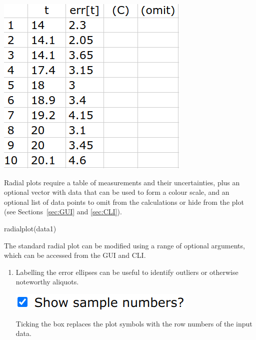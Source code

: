 \begin{refsection}
\noindent\begin{minipage}[t]{.27\linewidth}
  \strut\vspace*{-\baselineskip}\newline
  \includegraphics[width=\linewidth]{../figures/OtherRadialInput.png}
\end{minipage}
\begin{minipage}[t]{.73\linewidth}
  Radial plots require a table of measurements and their
  uncertainties, plus an optional vector with data that can be used to
  form a colour scale, and an optional list of data points to omit
  from the calculations or hide from the plot (see
  Sections~\ref{sec:GUI} and \ref{sec:CLI}).
\end{minipage}

\begin{console}
radialplot(data1)
\end{console}

The standard radial plot can be modified using a range of optional
arguments, which can be accessed from the GUI and CLI.

\begin{enumerate}

\item Labelling the error ellipses can be useful to identify outliers
  or otherwise noteworthy aliquots.

  \noindent\begin{minipage}[t]{.28\linewidth}
  \strut\vspace*{-\baselineskip}\newline
  \includegraphics[width=\linewidth]{../figures/concordiashownumbers.png}
\end{minipage}
\begin{minipage}[t]{.72\linewidth}
  Ticking the box replaces the plot symbols with the row numbers of
  the input data.
\end{minipage}


\end{enumerate}
\end{refsection}
